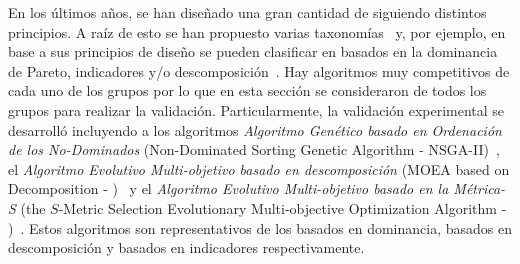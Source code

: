 En los últimos años, se han diseñado una gran cantidad de \MOEAS{} siguiendo distintos principios.
%
A raíz de esto se han propuesto varias taxonomías~\cite{Joel:BOOK_MOEAs} y, por ejemplo, en base a sus principios de diseño
se pueden clasificar en basados en la dominancia de Pareto, indicadores y/o descomposición~\cite{pilat2010evolutionary}.
%
Hay algoritmos muy competitivos de cada uno de los grupos por lo que en esta sección se consideraron \MOEAS{} de todos los grupos para realizar la validación.
%
Particularmente, la validación experimental se desarrolló incluyendo a los algoritmos \textit{Algoritmo Genético basado en Ordenación de los No-Dominados} 
(Non-Dominated Sorting Genetic Algorithm - NSGA-II)~\cite{Joel:NSGAII}, el \textit{Algoritmo Evolutivo Multi-objetivo basado en descomposición} (MOEA based on Decomposition - \MOEAD{})~\cite{Joel:MOEAD} 
y el \textit{Algoritmo Evolutivo Multi-objetivo basado en la Métrica-S} (the $S$-Metric Selection Evolutionary Multi-objective Optimization Algorithm - \SMSEMOA{})~\cite{Joel:SMSEMOA}.
%
Estos algoritmos son representativos de los basados en dominancia, basados en descomposición y basados en indicadores respectivamente.
%

